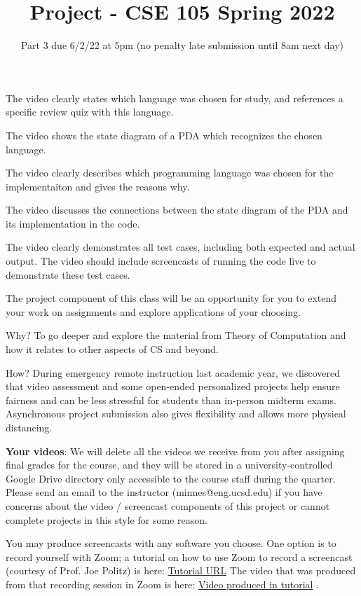 \documentclass[12pt, oneside]{article}
\begin{document}
The video clearly states which language was chosen for study, 
and references a specific review quiz with this language.

The video shows the state diagram of a PDA which recognizes the 
chosen language.

The video clearly describes which programming language was chosen 
for the implementaiton and gives the reasons why.

The video discusses the connections between the state diagram of the PDA 
and its implementation in the code.

The video clearly demonstrates all test cases, including both expected
and actual output. The video should include screencasts of 
running the code live to demonstrate these test cases.

\newpage

\title{Project - CSE 105 Spring 2022}
\date{Part 3 due 6/2/22 at 5pm (no penalty late submission until 8am next day)}


\maketitle
\thispagestyle{fancy}

\vspace{-30pt}

 The project component of this class will be an opportunity for you to extend your work on 
 assignments and explore applications of your choosing. 
 
 Why?  To go deeper and explore the material from Theory of Computation and how it relates to 
 other aspects of CS and beyond. 
 
 How?  During emergency remote instruction last academic year, we discovered that video 
 assessment and some open-ended personalized projects help ensure fairness and can be less 
 stressful for students than in-person midterm exams. Asynchronous project submission also 
 gives flexibility and allows more physical distancing. 
 
 {\bf Your videos}: We will delete all the videos we receive from you after assigning final grades for 
 the course, and they will be stored in a university-controlled Google Drive directory only 
 accessible to the course staff during the quarter. Please send an email to the instructor 
 (minnes@eng.ucsd.edu) if you have concerns about the video / screencast components of this 
 project or cannot complete projects in this style for some reason. 
 
 You may produce screencasts with any software you choose. One option is to record yourself 
 with Zoom; a tutorial on how to use Zoom to record a screencast (courtesy of Prof. Joe Politz) is 
 here: \href{https://drive.google.com/open?id=1KROMAQuTCk40zwrEFotlYSJJQdcG_GUU}{Tutorial URL}
 The video that was produced from that recording session in Zoom is here:
 \href{{https://drive.google.com/open?id=1MxJN6CQcXqIbOekDYMxjh7mTt1TyRVMl}}{Video produced in tutorial} .
 
\end{document}
